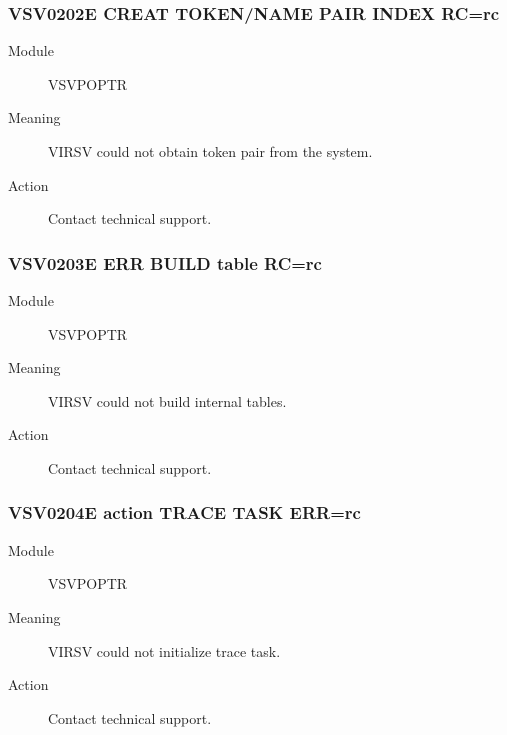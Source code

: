 \documentclass[letterpaper,10pt,english]{sphinxmanual}
\begin{document}
\subsubsection{VSV0202E CREAT TOKEN/NAME PAIR INDEX RC=rc}
\label{\detokenize{messages:vsv0202e-creat-token-name-pair-index-rc-rc}}\begin{description}
\item[{Module}] \leavevmode
VSVPOPTR

\item[{Meaning}] \leavevmode
VIRSV could not obtain token pair from the system.

\item[{Action}] \leavevmode
Contact technical support.

\end{description}


\subsubsection{VSV0203E ERR BUILD table RC=rc}
\label{\detokenize{messages:vsv0203e-err-build-table-rc-rc}}\begin{description}
\item[{Module}] \leavevmode
VSVPOPTR

\item[{Meaning}] \leavevmode
VIRSV could not build internal tables.

\item[{Action}] \leavevmode
Contact technical support.

\end{description}


\subsubsection{VSV0204E action TRACE TASK ERR=rc}
\label{\detokenize{messages:vsv0204e-action-trace-task-err-rc}}\begin{description}
\item[{Module}] \leavevmode
VSVPOPTR

\item[{Meaning}] \leavevmode
VIRSV could not initialize trace task.

\item[{Action}] \leavevmode
Contact technical support.

\end{description}
\end{document}
